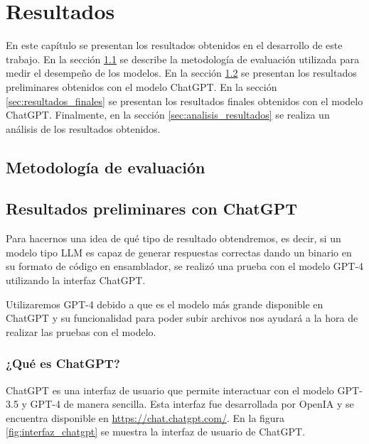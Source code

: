 \chapter{Resultados}
\label{cap:resultados}


En este capítulo se presentan los resultados obtenidos en el desarrollo de este trabajo. 
En la sección \ref{sec:evaluacion} se describe la metodología de evaluación utilizada 
para medir el desempeño de los modelos. En la sección \ref{sec:resultados_preliminares} 
se presentan los resultados preliminares obtenidos con el modelo ChatGPT. En la sección 
\ref{sec:resultados_finales} se presentan los resultados finales obtenidos con el modelo 
ChatGPT. Finalmente, en la sección \ref{sec:analisis_resultados} se realiza un análisis 
de los resultados obtenidos.

\section{Metodología de evaluación}
\label{sec:evaluacion}

\section{Resultados preliminares con ChatGPT}
\label{sec:resultados_preliminares}


Para hacernos una idea de qué tipo de resultado obtendremos, es decir, si un modelo
tipo LLM es capaz de generar respuestas correctas dando un binario en su formato
de código en ensamblador, se realizó una prueba con el modelo GPT-4 utilizando
la interfaz ChatGPT.

Utilizaremos GPT-4 debido a que es el modelo más grande disponible en ChatGPT y su
funcionalidad para poder subir archivos nos ayudará a la hora de realizar las pruebas
con el modelo.

\subsection{¿Qué es ChatGPT?}
\label{subsec:que_es_chatgpt}


ChatGPT es una interfaz de usuario que permite interactuar con el modelo GPT-3.5 y GPT-4
de manera sencilla. Esta interfaz fue desarrollada por OpenIA y se encuentra disponible
en \url{https://chat.chatgpt.com/}. En la figura \ref{fig:interfaz_chatgpt} se muestra la interfaz
de usuario de ChatGPT.

